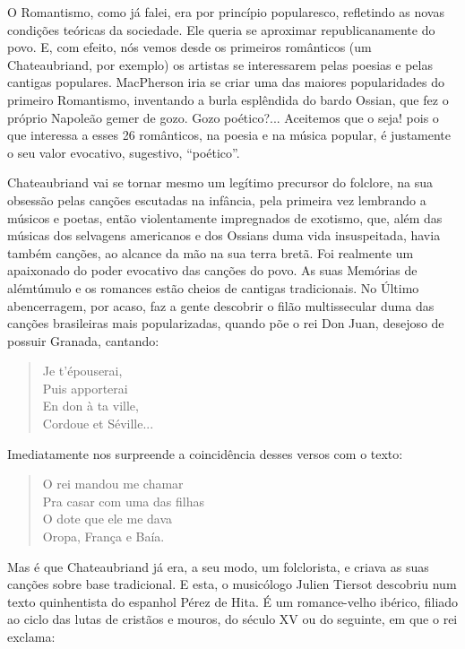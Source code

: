 O Romantismo, como já falei, era por princípio popularesco, refletindo
as novas condições teóricas da sociedade. Ele queria se aproximar
republicanamente do povo. E, com efeito, nós vemos desde os primeiros
românticos (um Chateaubriand, por exemplo) os artistas se interessarem
pelas poesias e pelas cantigas populares. MacPherson iria se criar uma
das maiores popularidades do primeiro Romantismo, inventando a burla
esplêndida do bardo Ossian, que fez o próprio Napoleão gemer de gozo.
Gozo poético?... Aceitemos que o seja! pois o que interessa a esses 26
românticos, na poesia e na música popular, é justamente o seu valor
evocativo, sugestivo, ``poético''.

Chateaubriand vai se tornar mesmo um legítimo precursor do folclore, na
sua obsessão pelas canções escutadas na infância, pela primeira vez
lembrando a músicos e poetas, então violentamente impregnados de
exotismo, que, além das músicas dos selvagens americanos e dos Ossians
duma vida insuspeitada, havia também canções, ao alcance da mão na sua
terra bretã. Foi realmente um apaixonado do poder evocativo das canções
do povo. As suas Memórias de alémtúmulo e os romances estão cheios de
cantigas tradicionais. No Último abencerragem, por acaso, faz a gente
descobrir o filão multissecular duma das canções brasileiras mais
popularizadas, quando põe o rei Don Juan, desejoso de possuir Granada,
cantando:

\begin{verse}
Je t'épouserai,\\
Puis apporterai\\
En don à ta ville,\\
Cordoue et Séville...
\end{verse}

Imediatamente nos surpreende a coincidência desses versos com o texto:

\begin{verse}
O rei mandou me chamar\\
Pra casar com uma das filhas\\
O dote que ele me dava\\
Oropa, França e Baía.
\end{verse}

Mas é que Chateaubriand já era, a seu modo, um folclorista, e criava as
suas canções sobre base tradicional. E esta, o musicólogo Julien Tiersot
descobriu num texto quinhentista do espanhol Pérez de Hita. É um
romance-velho ibérico, filiado ao ciclo das lutas de cristãos e mouros,
do século XV ou do seguinte, em que o rei exclama:

